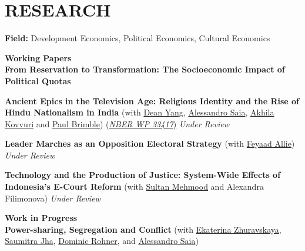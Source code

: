 \documentclass[letterpaper,11pt]{article}
\begin{document}
\section{\textbf{RESEARCH}}

\textbf{Field:} Development Economics, Political Economics, Cultural Economics

\vspace{0.25cm}
\textbf{\Large Working Papers}\\
\vspace{0.2cm}
\textbf{From Reservation to Transformation: The Socioeconomic Impact of Political Quotas}\\
\vspace{0.2cm}

\textbf{Ancient Epics in the Television Age: Religious Identity and the Rise of Hindu Nationalism in India} (with \href{https://deanyang-econ.github.io/deanyang/}{Dean Yang},
\href{https://sites.google.com/site/asaia9585/alessandro-saia}{Alessandro Saia}, 
\href{https://vpge.stanford.edu/people/akhila-kovvuri}{Akhila Kovvuri} and \href{https://pbrimble.github.io/}{Paul Brimble}) (\href{https://www.nber.org/system/files/working_papers/w33417/w33417.pdf}{\textit{NBER WP 33417})} \textit{Under Review}\\
\vspace{0.2cm}

\textbf{Leader Marches as an Opposition Electoral Strategy} (with \href{https://www.feyaadallie.com/}{Feyaad Allie}) \textit{Under Review}
\vspace{0.2cm}

\textbf{Technology and the Production of Justice: System-Wide Effects of Indonesia's E-Court Reform} (with 
\href{https://sites.google.com/view/sultan-mehmood/home}{Sultan Mehmood} and Alexandra Filimonova) \textit{Under Review}\\

\vspace{0.25cm}

\textbf{\Large Work in Progress}\\
\vspace{0.2cm}
\textbf{Power-sharing, Segregation and Conflict}
(with 
\href{http://www.parisschoolofeconomics.com/zhuravskaya-ekaterina/}{Ekaterina Zhuravskaya}, 
\href{https://saumitra.people.stanford.edu/}{Saumitra Jha}, 
\href{https://sites.google.com/site/dprohner/}{Dominic Rohner}, and 
\href{https://sites.google.com/site/asaia9585/alessandro-saia}{Alessandro Saia})\\
\end{document}
